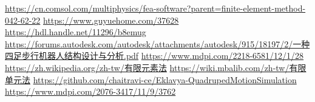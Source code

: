 \newpage
\renewcommand\bibname{參~考~文~獻}
\begin{thebibliography}{99}  %
\href{https://cn.comsol.com/multiphysics/fea-software?parent=finite-element-method-042-62-22}{https://cn.comsol.com/multiphysics/fea-software?parent=finite-element-method-042-62-22}
\href{https://www.guyuehome.com/37628}{https://www.guyuehome.com/37628}
\href{https://hdl.handle.net/11296/b8emug}{https://hdl.handle.net/11296/b8emug}
\href{https://forums.autodesk.com/autodesk/attachments/autodesk/915/18197/2/一种四足步行机器人结构设计与分析.pdf}{https://forums.autodesk.com/autodesk/attachments/autodesk/915/18197/2/一种四足步行机器人结构设计与分析.pdf}
\href{https://www.mdpi.com/2218-6581/12/1/28}{https://www.mdpi.com/2218-6581/12/1/28}
\href{https://zh.wikipedia.org/zh-tw/有限元素法}{https://zh.wikipedia.org/zh-tw/有限元素法}
\href{https://wiki.mbalib.com/zh-tw/有限单元法}{https://wiki.mbalib.com/zh-tw/有限单元法}
\href{https://github.com/chaitravi-ce/Eklavya-QuadrupedMotionSimulation}{https://github.com/chaitravi-ce/Eklavya-QuadrupedMotionSimulation}
\href{https://www.mdpi.com/2076-3417/11/9/3762}{https://www.mdpi.com/2076-3417/11/9/3762}\label{Robot}

%
\end{thebibliography}
\newpage
